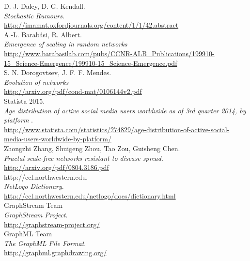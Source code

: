 \newpage
\begin{thebibliography}{5}


D. J. Daley, D. G. Kendall.\\
\emph{Stochastic Rumours}.\\
\url{http://imamat.oxfordjournals.org/content/1/1/42.abstract}\\

A.-L. Barabási, R. Albert.\\
\emph{Emergence of scaling in random networks}\\
\url{http://www.barabasilab.com/pubs/CCNR-ALB_Publications/199910-15_Science-Emergence/199910-15_Science-Emergence.pdf}\\

S. N. Dorogovtsev, J. F. F. Mendes.\\
\emph{Evolution of networks}\\
\url{http://arxiv.org/pdf/cond-mat/0106144v2.pdf}\\

Statista 2015.\\
\emph{Age distribution of active social media users worldwide as of 3rd quarter 2014, by platform }.\\
\url{http://www.statista.com/statistics/274829/age-distribution-of-active-social-media-users-worldwide-by-platform/}\\

Zhongzhi Zhang, Shuigeng Zhou, Tao Zou, Guisheng Chen.\\
\emph{Fractal scale-free networks resistant to disease spread}.\\
\url{http://arxiv.org/pdf/0804.3186.pdf}\\

http://ccl.northwestern.edu.\\
\emph{NetLogo Dictionary}.\\
\url{http://ccl.northwestern.edu/netlogo/docs/dictionary.html}\\

GraphStream Team\\
\emph{GraphStream Project}.\\
\url{http://graphstream-project.org/}\\

GraphML Team\\
\emph{The GraphML File Format}.\\
\url{http://graphml.graphdrawing.org/}\\


\end{thebibliography}
